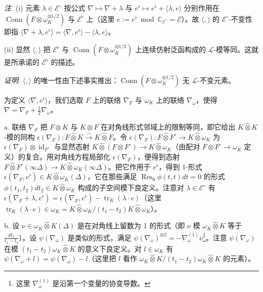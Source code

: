 \emph{注.} (i) 元素 $\lambda\in\mathcal{E}^{\circ}$ 按公式 $\nabla\mapsto\nabla+\lambda$ 与 $e^{\flat}\mapsto e^{\flat}+\langle\lambda,e\rangle$ 分别作用在 $\operatorname{Conn}(F\otimes\omega_{K}^{\otimes1/2})$ 与 $\mathcal{E}^{\flat}$ 上（这里 $e:=e^{\flat}\bmod\mathbb{C}_{\mathcal{E}^{\circ}}=\mathcal{E}$）。故 $\langle,\rangle$ 的 $\mathcal{E}^{\circ}$-不变性即指 $\langle\nabla+\lambda,e^{\flat}\rangle=\langle\nabla,e^{\flat}\rangle-\langle\lambda,e\rangle$。

(ii) 显然 $\langle,\rangle$ 把 $\mathcal{E}^{\flat}$ 与 $\operatorname{Conn}(F\otimes\omega_{K}^{\otimes1/2})$ 上连续仿射泛函构成的 $\mathcal{L}$-模等同。这就是所承诺的 $\mathcal{E}^{\flat}$ 的描述。


\emph{证明.} $\langle,\rangle$ 的唯一性由下述事实推出：$\operatorname{Conn}(F\otimes\omega_{K}^{\otimes1/2})$ 无 $\mathcal{L}$-不变元素。

为定义 $\langle\nabla,e^{\flat}\rangle$，我们选取 $F$ 上的联络 $\nabla_{F}$ 与 $\omega_{K}$ 上的联络 $\nabla_{\omega}$，使得 $\nabla=\nabla_{F}+\frac{1}{2}\nabla_{\omega}$。

a. 联络 $\nabla_{F}$ 把 $F\otimes K$ 与 $K\otimes F$ 在对角线形式邻域上的限制等同，即它给出 $K\widehat{\otimes}K$-模的同构 $\epsilon(\nabla_{F}):F\widehat{\otimes}K\xrightarrow{\sim}K\widehat{\otimes}F$。令 $\epsilon(\nabla_{F}):F\widehat{\otimes}F^{\circ}\to K\widehat{\otimes}\omega_{K}$ 为 $\epsilon(\nabla_{F})\otimes\operatorname{id}_{F^{\circ}}$ 与显然态射 $K\widehat{\otimes}(F\otimes F^{\circ})\to K\widehat{\otimes}\omega_{K}$（由配对 $F\otimes F^{\circ}\to\omega_{K}$ 定义）的复合。用对角线方程局部化 $\epsilon(\nabla_{F})$，便得到态射 $F\widehat{\otimes}F^{\circ}(\infty\Delta)\to K\widehat{\otimes}\omega_{K}(\infty\Delta)$。把它作用于 $e^{\flat}$，得到 1-形式 $\epsilon(\nabla_{F},e^{\flat})\in K\widehat{\otimes}\omega_{K}(\Delta)$，它在那些满足 $\operatorname{Res}_{0}\phi(t,t)dt=0$ 的形式 $\phi(t_{1},t_{2})dt_{2}\in K\widehat{\otimes}\omega_{K}$ 构成的子空间模下良定义。注意对 $\lambda\in\mathcal{E}^{\circ}$ 有 $\epsilon(\nabla_{F}+\lambda,e^{\flat})=\epsilon(\nabla_{F},e^{\flat})-\operatorname{tr}_{K}(\lambda\cdot e)$（这里 $\operatorname{tr}_{K}(\lambda\cdot e)\in\omega_{K}=K\widehat{\otimes}\omega_{K}/(t_{1}-t_{2})K\widehat{\otimes}\omega_{K}$）。

b. 设 $\nu\in\omega_{K}\widehat{\otimes}K(\Delta)$ 是在对角线上留数为 1 的形式（即 $\nu$ 模 $\omega_{K}\widehat{\otimes}K$ 等于 $\frac{dt_{1}}{t_{1}-t_{2}}$）。设 $\psi(\nabla_{\omega})$ 是类似的形式，满足 $\psi(\nabla_{\omega})^{\otimes2}=-\nabla^{(1)}_{\omega}\nu$\footnote{这里 $\nabla^{(1)}_{\omega}$ 是沿第一个变量的协变导数。}。注意 $\psi(\nabla_{\omega})$ 在模 $(t_{1}-t_{2})\omega_{K}\widehat{\otimes}K$ 的意义下良定义。对 $l\in\omega_{K}$ 有 $\psi(\nabla_{\omega}+l)=\psi(\nabla_{\omega})-l$（这里把 $l$ 看作 $\omega_{K}\widehat{\otimes}K/(t_{1}-t_{2})\omega_{K}\widehat{\otimes}K$ 的元素）。

